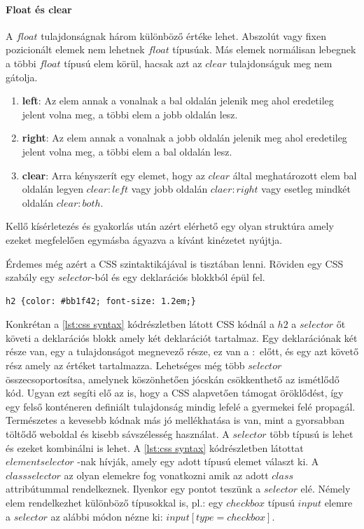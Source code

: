 \documentclass[12pt]{report}
\theoremstyle{definition}
\begin{document}
	\paragraph{Float és clear}A $float$ tulajdonságnak három különböző értéke lehet. Abszolút vagy fixen pozicionált elemek nem lehetnek $float$ típusúak. Más elemek normálisan lebegnek a többi $float$ típusú elem körül, hacsak azt az $clear$ tulajdonságuk meg nem gátolja.
	\begin{enumerate}
		\item\textbf{left}: Az elem annak a vonalnak a bal oldalán jelenik meg ahol eredetileg jelent volna meg, a többi elem a jobb oldalán lesz.
		\item\textbf{right}: Az elem annak a vonalnak a jobb oldalán jelenik meg ahol eredetileg jelent volna meg, a többi elem a bal oldalán lesz.
		\item\textbf{clear}: Arra kényszerít egy elemet, hogy az $clear$ által meghatározott elem bal oldalán legyen $clear:left$ vagy jobb oldalán $claer:right$ vagy esetleg mindkét oldalán $clear:both$.
	\end{enumerate}
	
	Kellő kísérletezés és gyakorlás után azért elérhető egy olyan struktúra amely ezeket megfelelően egymásba ágyazva a kívánt kinézetet nyújtja. 
	
	Érdemes még azért a CSS szintaktikájával is tisztában lenni. Röviden egy CSS szabály egy $selector$-ból és egy deklarációs blokkból épül fel.
	
	\noindent\begin{minipage}{\linewidth}
		\begin{lstlisting}[language=html,label={lst:css syntax}, caption={CSS szintaxis}]
h2 {color: #bb1f42; font-size: 1.2em;}
		\end{lstlisting}
	\end{minipage}
	
	Konkrétan a \ref{lst:css syntax} kódrészletben látott CSS kódnál a $h2$ a $selector$ őt követi a deklarációs blokk amely két deklarációt tartalmaz. Egy deklarációnak két része van, egy a tulajdonságot megnevező része, ez van a $:$ előtt, és egy azt követő rész amely az értéket tartalmazza. Lehetséges még több $selector$ összecsoportosítsa, amelynek köszönhetően jócskán csökkenthető az ismétlődő kód. Ugyan ezt segíti elő az is, hogy a CSS alapvetően támogat öröklődést, így egy felső konténeren definiált tulajdonság mindig lefelé a gyermekei felé propagál. Természetes a kevesebb kódnak más jó mellékhatása is van, mint a gyorsabban töltődő weboldal és kisebb sávszélesség használat. A $selector$ több típusú is lehet és ezeket kombinálni is lehet. A \ref{lst:css syntax} kódrészletben látottat $element selector$ -nak hívják, amely egy adott típusú elemet választ ki. A $class selector$ az olyan elemekre fog vonatkozni amik az adott $class$ attribútummal rendelkeznek. Ilyenkor egy pontot teszünk a $selector$ elé. Némely elem rendelkezhet különböző típusokkal is, pl.: egy $checkbox$ típusú $input$ elemre a $selector$ az alábbi módon nézne ki: $input[type=checkbox]$.
	
\end{document}
